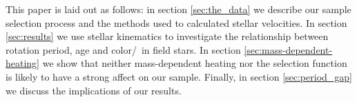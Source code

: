 

This paper is laid out as follows: in section \ref{sec:the_data} we describe
our sample selection process and the methods used to calculated stellar
velocities.
In section \ref{sec:results} we use stellar kinematics to investigate the
relationship between rotation period, age and color/\teff\ in field stars.
In section \ref{sec:mass-dependent-heating} we show that neither
mass-dependent heating nor the selection function is likely to have a strong
affect on our sample.
Finally, in section \ref{sec:period_gap} we discuss the implications of our
results.
